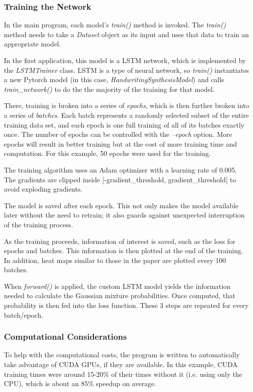 \documentclass{article}
\begin{document}
\subsubsection{Training the Network}
In the main program, each model's \textit{train()} method is invoked. The \textit{train()} method needs to take a \textit{Dataset} object as its input and uses that data to train an appropriate model.

In the first application, this model is a LSTM network, which is implemented by the \textit{LSTMTrainer} class. LSTM is a type of neural network, so \textit{train()} instantiates a new Pytorch model (in this case, \textit{HandwritingSynthesisModel}) and calls \textit{train\_network()} to do the the majority of the training for that model.

There, training is broken into a series of \textit{epochs}, which is then further broken into a series of \textit{batches}. Each batch represents a randomly selected subset of the entire training data set, and each epoch is one full training of all of its batches exactly once. The number of epochs can be controlled with the \textit{--epoch} option. More epochs will result in better training but at the cost of more training time and computation. For this example, 50 epochs were used for the training.

The training algorithm uses an Adam optimizer with a learning rate of 0.005. The gradients are clipped inside [-gradient\_threshold, gradient\_threshold] to avoid exploding gradients.

The model is saved after each epoch. This not only makes the model available later without the need to retrain; it also guards against unexpected interruption of the training process.

As the training proceeds, information of interest is saved, such as the loss for epochs and batches. This information is then plotted at the end of the training. In addition, heat maps similar to those in the paper are plotted every 100 batches.

When \textit{forward()} is applied, the custom LSTM model yields the information needed to calculate the Gaussian mixture probabilities. Once computed, that probability is then fed into the loss function. These 3 steps are repeated for every batch/epoch.

\subsubsection{Computational Considerations}
To help with the computational costs, the program is written to automatically take advantage of CUDA GPUs, if they are available. In this example, CUDA training times were around 15-20\% of their times without it (i.e. using only the CPU), which is about an 85\% speedup on average.
\end{document}
